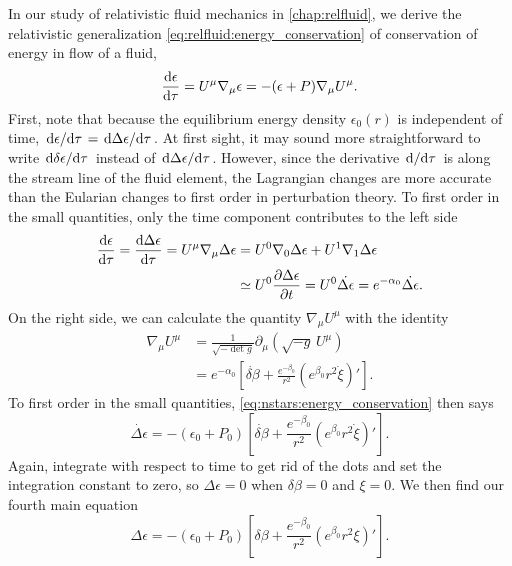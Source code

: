 In our study of relativistic fluid mechanics in \cref{chap:relfluid}, we derive the relativistic generalization \eqref{eq:relfluid:energy_conservation} of conservation of energy in flow of a fluid,
\begin{equation}
	\odv{\epsilon}{\tau} = U^\mu \nabla_\mu \epsilon = -(\epsilon+P) \nabla_\mu U^\mu  .
\label{eq:nstars:energy_conservation}
\end{equation}
First, note that because the equilibrium energy density $\epsilon_0(r)$ is independent of time, $\odv{\epsilon}/{\tau} = \odv{\Delta \epsilon}/{\tau}$.
At first sight, it may sound more straightforward to write $\odv{\delta \epsilon}/{\tau}$ instead of $\odv{\Delta \epsilon}/{\tau}$.
However, since the derivative $\odv{}/{\tau}$ is along the stream line of the fluid element, the Lagrangian changes are more accurate than the Eularian changes to first order in perturbation theory.
To first order in the small quantities, only the time component contributes to the left side
\begin{equation}
\begin{split}
	\odv{\epsilon}{\tau} =
	\odv{\Delta \epsilon}{\tau} =
	U^\mu \nabla_\mu \Delta \epsilon &=
	U^0 \nabla_0 \Delta \epsilon + U^1 \nabla_1 \Delta \epsilon \\
	&\taylor U^0 \pdv{\Delta \epsilon}{t} = U^0 \dot{\Delta \epsilon} =
	e^{-\alpha_0} \dot{\Delta \epsilon} .
\end{split}
\end{equation}
On the right side, we can calculate the quantity $\nabla_\mu U^\mu$ with the identity
\begin{equation}
\begin{split}
	\nabla_\mu U^\mu &= \frac{1}{\sqrt{-\det{g}}} \partial_\mu \left( \sqrt{-g} \, U^\mu \right) \\
	                 &= e^{-\alpha_0} \left[ \dot{\delta\beta} + \frac{e^{-\beta_0}}{r^2} \left( e^{\beta_0} r^2 \dot\xi \right)' \right] .
\end{split}
\end{equation}
To first order in the small quantities, \cref{eq:nstars:energy_conservation} then says
\begin{equation}
	\dot{\Delta \epsilon} = - \left( \epsilon_0 + P_0 \right) \left[ \dot{\delta\beta} + \frac{e^{-\beta_0}}{r^2} \left( e^{\beta_0} r^2 \dot\xi \right)' \right] .
\end{equation}
Again, integrate with respect to time to get rid of the dots and set the integration constant to zero, so $\Delta \epsilon = 0$ when $\delta \beta = 0$ and $\xi = 0$.
We then find our fourth main equation
\begin{equation}
	\Delta \epsilon = - \left( \epsilon_0 + P_0 \right) \left[ \delta\beta + \frac{e^{-\beta_0}}{r^2} \left( e^{\beta_0} r^2 \xi \right)' \right] .
\label{eq:nstars:Delta_epsilon}
\end{equation}

